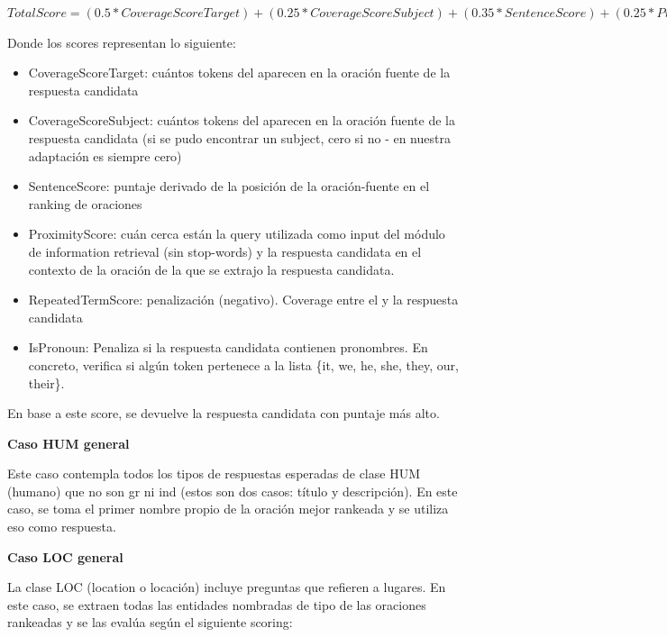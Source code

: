 $TotalScore = (0.5 * CoverageScoreTarget)+ (0.25 * CoverageScoreSubject) + (0.35 * SentenceScore) +
					 (0.25 * ProximityScore)	+ (0.1 * RepeatedTermScore) + (0.5 * IsPronoun)$\newline

Donde los scores representan lo siguiente:
\begin{itemize}
  \item CoverageScoreTarget: cuántos tokens del  aparecen en la oración fuente de la respuesta candidata
  \item CoverageScoreSubject: cuántos tokens del  aparecen en la oración fuente de la respuesta candidata (si se pudo encontrar un subject, cero si no - en nuestra adaptación es siempre cero)
  \item SentenceScore: puntaje derivado de la posición de la oración-fuente en el ranking de oraciones
  \item ProximityScore: cuán cerca están la query utilizada como input del módulo de information retrieval (sin stop-words) y la respuesta candidata en el contexto de la oración de la que se extrajo la respuesta candidata.
  \item RepeatedTermScore: penalización (negativo). Coverage entre el  y la respuesta candidata
  \item IsPronoun: Penaliza si la respuesta candidata contienen pronombres. En concreto, verifica si algún token pertenece a la lista \{it, we, he, she, they, our, their\}.
\end{itemize}

En base a este score, se devuelve la respuesta candidata con puntaje más alto. \newline

\textbf{Caso HUM general} \newline

Este caso contempla todos los tipos de respuestas esperadas de clase HUM (humano) que no son gr ni ind (estos son dos casos: título y descripción). En este caso, se toma el primer nombre propio de la oración mejor rankeada y se utiliza eso como respuesta. \newline

\textbf{Caso LOC general} \newline

La clase LOC (location o locación) incluye preguntas que refieren a lugares.  En este caso, se extraen todas las entidades nombradas de tipo  de las oraciones rankeadas y se las evalúa según el siguiente scoring:

